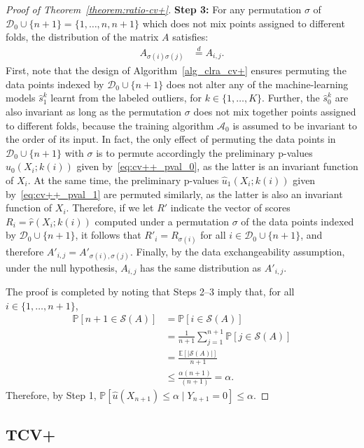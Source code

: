 \documentclass[11pt]{article}
\renewcommand{\P}[1]{\mathbb{P}\left[#1\right]}
\newcommand{\E}[1]{\mathbb{E}\left[#1\right]}
\begin{document}
\begin{proof}[Proof of Theorem~\ref{theorem:ratio-cv+}]
\textbf{Step 3:} For any permutation $\sigma$ of $\mathcal{D}_0 \cup \{n+1\} = \{1,\ldots,n,n+1\}$ which does not mix points assigned to different folds, the distribution of the matrix $A$ satisfies:
\begin{align*}
    A_{\sigma(i)\sigma(j)}
    & \stackrel{d}{=} A_{i,j}.
\end{align*}
First, note that the design of Algorithm~\ref{alg_clra_cv+} ensures permuting the data points indexed by $\mathcal{D}_0 \cup \{n+1\}$ does not alter any of the machine-learning models $\hat{s}_1^k$ learnt from the labeled outliers, for $k \in \{1,\ldots,K\}$. Further, the $\hat{s}_0^k$ are also invariant as long as the permutation $\sigma$ does not mix together points assigned to different folds, because the training algorithm $\mathcal{A}_0$ is assumed to be invariant to the order of its input.
In fact, the only effect of permuting the data points in $\mathcal{D}_0 \cup \{n+1\}$ with $\sigma$ is to permute accordingly the preliminary p-values $\hat{u}_0(X_i; k(i))$ given by~\eqref{eq:cv++_pval_0}, as the latter is an invariant function of $X_i$. At the same time, the preliminary p-values $\hat{u}_1(X_i; k(i))$ given by~\eqref{eq:cv++_pval_1} are permuted similarly, as the latter is also an invariant function of $X_i$.
Therefore, if we let $R'$ indicate the vector of scores $R_{i}=\hat{r}(X_{i}; k(i))$ computed under a permutation $\sigma$ of the data points indexed by $\mathcal{D}_0 \cup \{n+1\}$, it follows that $R'_{i} = R_{\sigma(i)}$ for all $i \in \mathcal{D}_0 \cup \{n+1\}$, and therefore $ A'_{i,j} = A'_{\sigma(i),\sigma(j)}$.
Finally, by the data exchangeability assumption, under the null hypothesis, $A_{i,j}$ has the same distribution as $A'_{i,j}$.

The proof is completed by noting that Steps 2--3 imply that, for all $i \in \{1,\dots,n+1\}$,
\begin{align*}
    \P{n+1 \in \mathcal{S}(A)}
  & = \P{i \in \mathcal{S}(A)}  \\
  & = \frac{1}{n+1} \sum_{j =1}^{n+1} \P{j \in \mathcal{S}(A)} \\
  & = \frac{\E{|\mathcal{S}(A)|}}{n+1} \\
  & \leq \frac{\alpha(n+1)}{(n+1)} = \alpha.
\end{align*}
Therefore, by Step 1, $\P{\hat{u}(X_{n+1}) \leq \alpha \mid Y_{n+1} = 0} \leq \alpha$.
\end{proof}


\subsection{TCV+}
\end{document}

